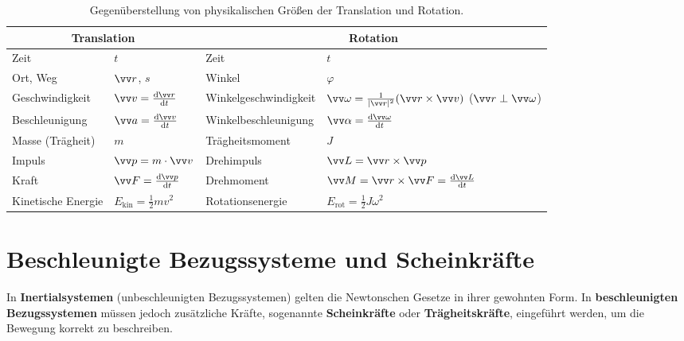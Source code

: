 \begin{table}[h!]
\centering
\caption{Gegenüberstellung von physikalischen Größen der Translation und Rotation.}\label{tab: analogie_trans_rot}
\renewcommand{\arraystretch}{1.5}
\begin{tabular}{ll|ll}
\toprule
\multicolumn{2}{c|}{\textbf{Translation}} & \multicolumn{2}{c}{\textbf{Rotation}} \\
\midrule
Zeit & $t$ & Zeit & $t$ \\
Ort, Weg & $\ivec{r}$, $s$ & Winkel & $\varphi$ \\
Geschwindigkeit & $\ivec{v} = \frac{\dd\ivec{r}}{\dd t}$ & Winkelgeschwindigkeit & $\ivec{\omega} = \frac{1}{|\ivec{r}|^2}(\ivec{r}\times\ivec{v})$ ($\ivec{r}\perp\ivec{\omega}$) \\
Beschleunigung & $\ivec{a} = \frac{\dd\ivec{v}}{\dd t}$ & Winkelbeschleunigung & $\ivec{\alpha} = \frac{\dd\ivec{\omega}}{\dd t}$ \\
Masse (Trägheit) & $m$ & Trägheitsmoment & $J$ \\
Impuls & $\ivec{p} = m \cdot \ivec{v}$ & Drehimpuls & $\ivec{L} = \ivec{r} \times \ivec{p}$ \\
Kraft & $\ivec{F} = \frac{\dd\ivec{p}}{\dd t}$ & Drehmoment & $\ivec{M} = \ivec{r} \times \ivec{F} = \frac{\dd\ivec{L}}{\dd t}$ \\
Kinetische Energie & $E_{\text{kin}} = \frac{1}{2} m v^2$ & Rotationsenergie & $E_{\text{rot}} = \frac{1}{2} J \omega^2$ \\
\bottomrule
\end{tabular}
\end{table}

\section{Beschleunigte Bezugssysteme und Scheinkräfte}\label{sec: scheinkraefte}

In \textbf{Inertialsystemen} (unbeschleunigten Bezugssystemen) gelten die Newtonschen Gesetze in ihrer gewohnten Form. In \textbf{beschleunigten Bezugssystemen} müssen jedoch zusätzliche Kräfte, sogenannte \textbf{Scheinkräfte} oder \textbf{Trägheitskräfte}, eingeführt werden, um die Bewegung korrekt zu beschreiben.

